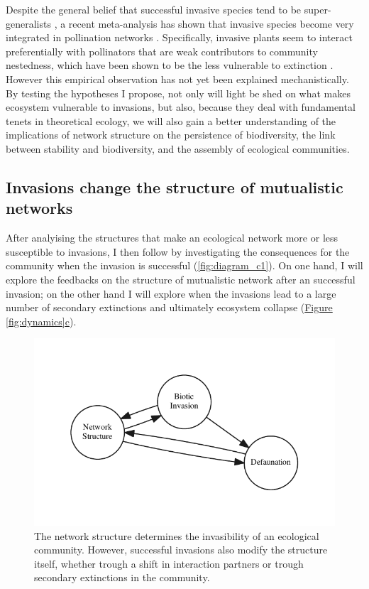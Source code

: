 \documentclass[a4paper]{article}
\begin{document}
Despite the general belief that successful invasive species tend to be super-generalists \autocite{Richardson2000, Aizen2008, Vila2009, Albrecht2014}, a recent meta-analysis has shown that invasive species become very integrated in pollination networks \autocite{Stouffer2014}.
Specifically, invasive plants seem to interact preferentially with pollinators that are weak contributors to community nestedness, which have been shown to be the less vulnerable to extinction \autocite{Saavedra2011, Stouffer2014}.
However this empirical observation has not yet been explained mechanistically.
By testing the hypotheses I propose, not only will light be shed on what makes ecosystem vulnerable to invasions, but also, because they deal with fundamental tenets in theoretical ecology, we will also gain a better understanding of the implications of network structure on the persistence of biodiversity, the link between stability and biodiversity, and the assembly of ecological communities.

\subsection{Invasions change the structure of mutualistic networks}

After analyising the structures that make an ecological network more or less susceptible to invasions, I then follow by investigating the consequences for the community when the invasion is successful (\autoref{fig:diagram_c1}).
On one hand, I will explore the feedbacks on the structure of mutualistic network after an successful invasion; on the other hand I will explore when the invasions lead to a large number of secondary extinctions and ultimately ecosystem collapse (\hyperref[fig:dynamics]{Figure \ref{fig:dynamics}c}).

\begin{figure}[tbp]
  \centering
  \includegraphics{diagram_c1}
  \caption{
  \label{fig:diagram_c1}
  The network structure determines the invasibility of an ecological community.
  However, successful invasions also modify the structure itself, whether trough a shift in interaction partners or trough secondary extinctions in the community.
  }
\end{figure}
\end{document}
